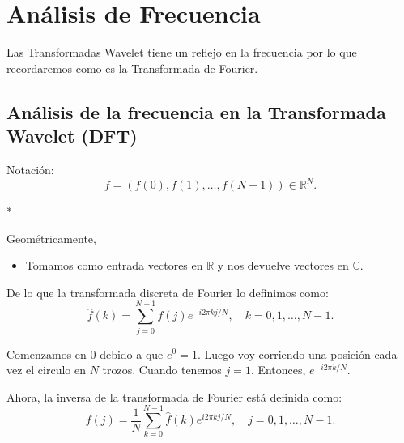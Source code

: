 \chapter{Análisis de Frecuencia}

\begin{paracol}{2}
Las Transformadas Wavelet tiene un reflejo en la frecuencia por lo que recordaremos como es la Transformada de Fourier.

\section{Análisis de la frecuencia en la Transformada Wavelet (DFT)}

Notación:
$$f=\left(f(0),f(1),\ldots,f(N-1)\right)\in \mathbb{R}^N.$$

\switchcolumn[1]*{\noindent\scriptsize
Geométricamente,
\begin{center}
    \begin{itemize}
	\item Tomamos como entrada vectores en $\mathbb{R}$ y nos devuelve vectores en $\mathbb{C}$.
    \end{itemize}
\end{center}
}
\switchcolumn[0]
De lo que la transformada discreta de Fourier lo definimos como:
\begin{equation}
\hat{f}(k)=\sum_{j=0}^{N-1}f(j)e^{-i2\pi kj/N}, \quad k=0,1,\ldots,N-1.
\end{equation}

Comenzamos en $0$ debido a que $e^0=1$. Luego voy corriendo una posición cada vez el circulo en $N$ trozos. Cuando tenemos $j=1$. Entonces, $e^{-i2\pi k/N}$.

Ahora, la inversa de la transformada de Fourier está definida como:
\begin{equation}
    f(j)=\frac{1}{N}\sum_{k=0}^{N-1}\hat{f}(k)e^{i2\pi kj/N}, \quad j=0,1,\ldots,N-1.
\end{equation}


\end{paracol}
